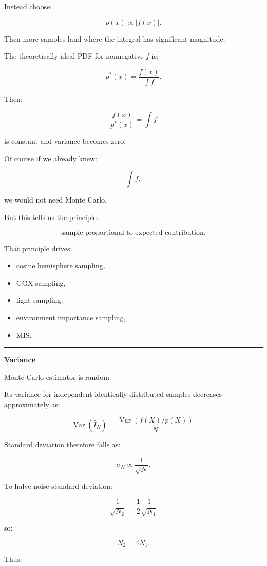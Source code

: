 Instead choose:

\[
p(x)
\propto|f(x)|.
\]

Then more samples land where the integral has significant magnitude.

The theoretically ideal PDF for nonnegative \(f\) is:

\[
p^*(x)
=
\frac{f(x)}
{\int f}.
\]

Then:

\[
\frac{f(x)}{p^*(x)}
=
\int f
\]

is constant and variance becomes zero.

Of course if we already knew:

\[
\int f,
\]

we would not need Monte Carlo.

But this tells us the principle:

\[
\boxed{
\text{sample proportional to expected contribution}.
}
\]

That principle drives:

\begin{itemize}
\tightlist
\item
  cosine hemisphere sampling,
\item
  GGX sampling,
\item
  light sampling,
\item
  environment importance sampling,
\item
  MIS.
\end{itemize}

\begin{center}\rule{0.5\linewidth}{0.5pt}\end{center}

\textbf{Variance}

Monte Carlo estimator is random.

Its variance for independent identically distributed samples decreases approximately as:

\[
\boxed{
\operatorname{Var}(\hat I_N)
=
\frac{
\operatorname{Var}(f(X)/p(X))
}{
N
}.
}
\]

Standard deviation therefore falls as:

\[
\boxed{
\sigma_N
\propto
\frac1{\sqrt N}.
}
\]

To halve noise standard deviation:

\[
\frac1{\sqrt{N_2}}
=
\frac12
\frac1{\sqrt{N_1}}
\]

so:

\[
N_2=4N_1.
\]

Thus:

